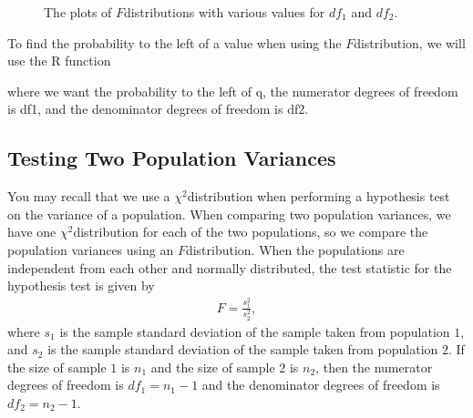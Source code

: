 \documentclass[letterpaper,10pt,english]{jupyterBook}
\begin{document}
\begin{figure}[htbp]
\centering
\capstart

\noindent{}
\caption{The plots of \(F\)\sphinxhyphen{}distributions with various values for \(df_1\) and \(df_2\).}\label{\detokenize{Ch9 Hypothesis Tests of Two or More Populations/9.2 Hypothesis Testing Two Population Variances:f-dist}}\end{figure}

\sphinxAtStartPar
To find the probability to the left of a value when using the \(F\)\sphinxhyphen{}distribution, we will use the R function

\begin{sphinxVerbatim}[commandchars=\\\{\}]
\end{sphinxVerbatim}

\sphinxAtStartPar
where we want the probability to the left of q, the numerator degrees of freedom is df1, and the denominator degrees of freedom is df2.


\subsection{Testing Two Population Variances}
\label{\detokenize{Ch9 Hypothesis Tests of Two or More Populations/9.2 Hypothesis Testing Two Population Variances:testing-two-population-variances}}
\sphinxAtStartPar
You may recall that we use a \(\chi^2\)\sphinxhyphen{}distribution when performing a hypothesis test on the variance of a population. When comparing two population variances, we have one \(\chi^2\)\sphinxhyphen{}distribution for each of the two populations, so we compare the population variances using an \(F\)\sphinxhyphen{}distribution. When the populations are independent from each other and normally distributed, the test statistic for the hypothesis test is given by
\begin{equation*}
\begin{split} F = \frac{s_1^2}{s_2^2}, \end{split}
\end{equation*}
\sphinxAtStartPar
where \(s_1\) is the sample standard deviation of the sample taken from population \(1\), and \(s_2\) is the sample standard deviation of the sample taken from population \(2\). If the size of sample \(1\) is \(n_1\) and the size of sample \(2\) is \(n_2\), then the numerator degrees of freedom is \(df_1 = n_1 - 1\) and the denominator degrees of freedom is \(df_2 = n_2 - 1\).
\end{document}
